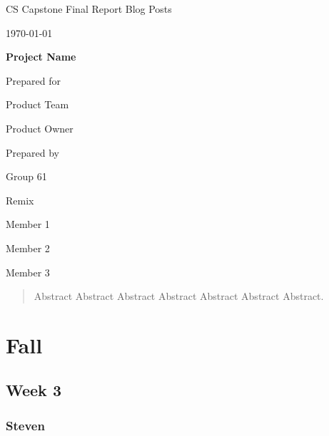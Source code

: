 \documentclass[onecolumn, draftclsnofoot,10pt, compsoc]{IEEEtran}
\def \CapstoneTeamName{		Remix}
\def \CapstoneTeamNumber{		61}
\def \GroupMemberOne{			Member 1}
\def \GroupMemberTwo{			Member 2}
\def \GroupMemberThree{			Member 3}
\def \CapstoneProjectName{		Project Name}
\def \CapstoneSponsorCompany{	Product Team}
\def \CapstoneSponsorPerson{		Product Owner}
\def \DocType{
	Final Report Blog Posts
}
\newcommand{\NameSigPair}[1]{\par
	\makebox[2.75in][r]{#1} \hfil 	\makebox[3.25in]{\makebox[2.25in]{\hrulefill} \hfill		\makebox[.75in]{\hrulefill}}
	\par\vspace{-12pt} \textit{\tiny\noindent
		\makebox[2.75in]{} \hfil		\makebox[3.25in]{\makebox[2.25in][r]{Signature} \hfill	\makebox[.75in][r]{Date}}}}
\renewcommand{\NameSigPair}[1]{#1}
\begin{document}
	
\begin{titlepage}
	\begin{singlespace}
		\hfill
		\par\vspace{.2in}
		\centering
		\scshape{
			\huge CS Capstone \DocType \par
			{\large\today}\par
			\vspace{.5in}
			\textbf{\Huge\CapstoneProjectName}\par
			\vfill
			{\large Prepared for}\par
			\Huge \CapstoneSponsorCompany\par
			\vspace{5pt}
			{\Large\NameSigPair{\CapstoneSponsorPerson}\par}
			{\large Prepared by }\par
			Group\CapstoneTeamNumber\par
			\CapstoneTeamName\par
			\vspace{5pt}
			{\Large
				\NameSigPair{\GroupMemberOne}\par
				\NameSigPair{\GroupMemberTwo}\par
				\NameSigPair{\GroupMemberThree}\par
			}
			\vspace{20pt}
		}
		\begin{abstract}
			\noindent Abstract Abstract Abstract Abstract  Abstract  Abstract  Abstract.
		\end{abstract}
	\end{singlespace}
\end{titlepage}
\tableofcontents
\section{Fall}

\subsection{Week 3}
\subsubsection{Steven}
\end{document}
